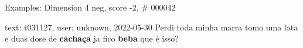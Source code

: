 \begin{frame}{Examples: Dimension 4 neg, score -2, \# 000042}
\footnotesize
\begin{alertblock}{text: t031127, user: unknown, 2022-05-30}
Perdi toda minha marra tomo uma lata e duas dose de \textbf{cachaça} ja fico 
\textbf{beba} que é isso? 
\end{alertblock}
\end{frame}
